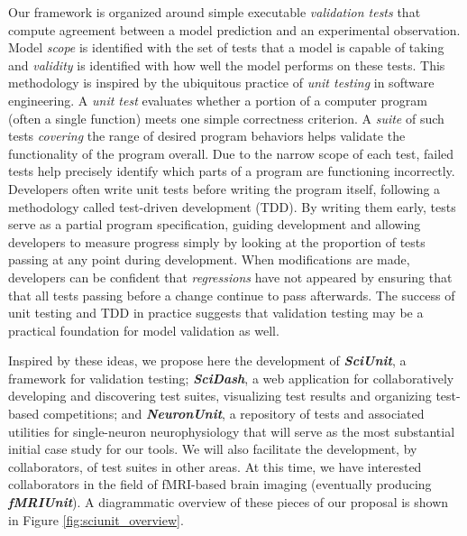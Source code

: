 \documentclass[11pt,letterpaper]{article}
\begin{document}
Our framework is organized around simple executable \emph{validation tests} that compute agreement between a model prediction and an experimental observation. Model \textit{scope} is identified with the set of tests that a model is capable of taking and \textit{validity} is identified with how well the model performs on these tests. This methodology is inspired by the ubiquitous practice of \emph{unit testing} in software engineering. A \emph{unit test} evaluates whether a portion of a computer program (often a single function) meets one simple correctness criterion. A \textit{suite} of such tests \emph{covering} the range of desired program behaviors helps validate the functionality of the program overall. Due to the narrow scope of each test, failed tests help precisely identify which parts of a program are functioning incorrectly. Developers often write unit tests before writing the program itself, following a methodology called test-driven development (TDD)\cite{beck2003}. By writing them early, tests serve as a partial program specification, guiding development and allowing developers to measure progress simply by looking at the proportion of tests passing at any point during development. When modifications are made, developers can be confident that \emph{regressions} have not appeared by ensuring that that all tests passing before a change continue to pass afterwards. The success of unit testing and TDD in practice suggests that validation testing may be a practical foundation for model validation as well.  

Inspired by these ideas, we propose here the development of \textbf{\textit{SciUnit}}, a framework for validation testing; \textbf{\textit{SciDash}}, a web application for collaboratively developing and discovering test suites, visualizing test results and organizing test-based competitions; and \textbf{\textit{NeuronUnit}}, a repository of tests and associated utilities for single-neuron neurophysiology that will serve as the most substantial initial case study for our tools. We will also facilitate the development, by collaborators, of test suites in other areas. At this time, we have interested collaborators in the field of fMRI-based brain imaging (eventually producing \textbf{\textit{fMRIUnit}}). A diagrammatic overview of these pieces of our proposal is shown in Figure \ref{fig:sciunit_overview}.
\end{document}
